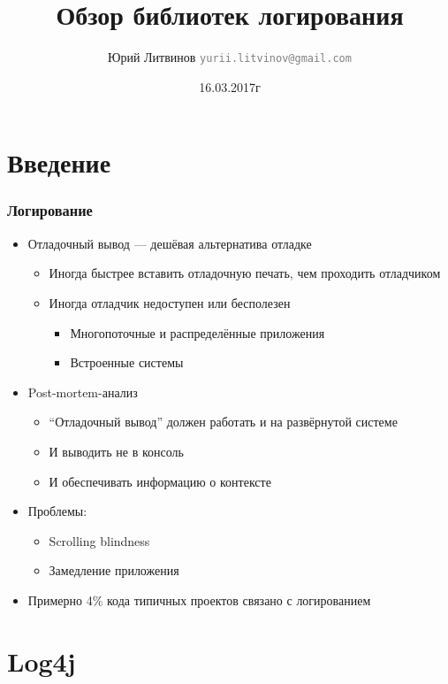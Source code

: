\documentclass[xetex,mathserif,serif]{beamer}
\title{Обзор библиотек логирования}
\author[Юрий Литвинов]{Юрий Литвинов \newline \textcolor{gray}{\small\texttt{yurii.litvinov@gmail.com}}}
\date{16.03.2017г}
\begin{document}
	
	\frame{\titlepage}
	
	\section{Введение}

	\begin{frame}
		\frametitle{Логирование}
		\begin{itemize}
			\item Отладочный вывод --- дешёвая альтернатива отладке
			\begin{itemize}
				\item Иногда быстрее вставить отладочную печать, чем проходить отладчиком
				\item Иногда отладчик недоступен или бесполезен
				\begin{itemize}
					\item Многопоточные и распределённые приложения
					\item Встроенные системы
				\end{itemize}
			\end{itemize}
			\item Post-mortem-анализ
			\begin{itemize}
				\item ``Отладочный вывод'' должен работать и на развёрнутой системе
				\item И выводить не в консоль
				\item И обеспечивать информацию о контексте
			\end{itemize}
			\item Проблемы:
			\begin{itemize}
				\item Scrolling blindness
				\item Замедление приложения
			\end{itemize}
			\item Примерно 4\% кода типичных проектов связано с логированием
		\end{itemize}
	\end{frame}

	\section{Log4j}
\end{document}
